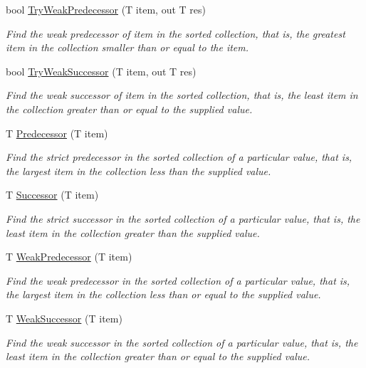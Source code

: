 \begin{DoxyCompactItemize}
bool \hyperlink{interface_c5_1_1_i_sorted_aeabd71eb284ab4130d190b60a2f64584}{Try\+Weak\+Predecessor} (T item, out T res)
\begin{DoxyCompactList}\small\item\em Find the weak predecessor of item in the sorted collection, that is, the greatest item in the collection smaller than or equal to the item. \end{DoxyCompactList}\item 
bool \hyperlink{interface_c5_1_1_i_sorted_ace630ae0bea6fd7772e6e9fa21ea2567}{Try\+Weak\+Successor} (T item, out T res)
\begin{DoxyCompactList}\small\item\em Find the weak successor of item in the sorted collection, that is, the least item in the collection greater than or equal to the supplied value. \end{DoxyCompactList}\item 
T \hyperlink{interface_c5_1_1_i_sorted_a973bf071df358a008bdfed289a38ff71}{Predecessor} (T item)
\begin{DoxyCompactList}\small\item\em Find the strict predecessor in the sorted collection of a particular value, that is, the largest item in the collection less than the supplied value. \end{DoxyCompactList}\item 
T \hyperlink{interface_c5_1_1_i_sorted_a6620b9769f5125157e254d8077744515}{Successor} (T item)
\begin{DoxyCompactList}\small\item\em Find the strict successor in the sorted collection of a particular value, that is, the least item in the collection greater than the supplied value. \end{DoxyCompactList}\item 
T \hyperlink{interface_c5_1_1_i_sorted_aac28eacc400148e84e0d24e14709a9f7}{Weak\+Predecessor} (T item)
\begin{DoxyCompactList}\small\item\em Find the weak predecessor in the sorted collection of a particular value, that is, the largest item in the collection less than or equal to the supplied value. \end{DoxyCompactList}\item 
T \hyperlink{interface_c5_1_1_i_sorted_a52c5bf3983dfb2378ec431206d1ee8ce}{Weak\+Successor} (T item)
\begin{DoxyCompactList}\small\item\em Find the weak successor in the sorted collection of a particular value, that is, the least item in the collection greater than or equal to the supplied value. \end{DoxyCompactList}\item 

\end{DoxyCompactItemize}
